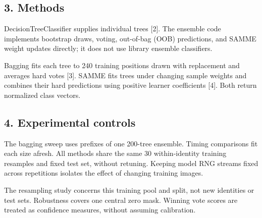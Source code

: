 \documentclass[10pt,twocolumn,letterpaper]{article}
\begin{document}
\subsection*{3. Methods}
DecisionTreeClassifier supplies individual trees [2]. The ensemble code implements bootstrap draws, voting, out-of-bag (OOB) predictions, and SAMME weight updates directly; it does not use library ensemble classifiers.

Bagging fits each tree to 240 training positions drawn with replacement and averages hard votes [3]. SAMME fits trees under changing sample weights and combines their hard predictions using positive learner coefficients [4]. Both return normalized class vectors.

\subsection*{4. Experimental controls}
The bagging sweep uses prefixes of one 200-tree ensemble. Timing comparisons fit each size afresh. All methods share the same 30 within-identity training resamples and fixed test set, without retuning. Keeping model RNG streams fixed across repetitions isolates the effect of changing training images.

The resampling study concerns this training pool and split, not new identities or test sets. Robustness covers one central zero mask. Winning vote scores are treated as confidence measures, without assuming calibration.
\end{document}
